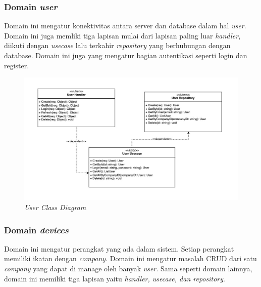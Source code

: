 \pagebreak

\subsubsection{Domain \textit{user}}

Domain ini mengatur konektivitas antara server dan database dalam hal \textit{user}. Domain ini juga memliki tiga lapisan mulai dari lapisan paling luar \textit{handler}, diikuti dengan \textit{usecase} lalu terkahir \textit{repository} yang berhubungan dengan database. Domain ini juga yang mengatur bagian autentikasi seperti login dan register.

\begin{figure}[ht]
  \centering
  \includegraphics[width=1\textwidth]{resources/chapter-3/class/user-class-diagram.jpg}
  \caption{\t\textit{User Class Diagram}}
  \label{fig:user-class-diagram}
\end{figure}

\subsubsection{Domain \textit{devices}}

Domain ini mengatur perangkat yang ada dalam sistem. Setiap perangkat memiliki ikatan dengan \textit{company}. Domain ini mengatur masalah CRUD dari satu \textit{company} yang dapat di manage oleh banyak \textit{user}. Sama seperti domain lainnya, domain ini memiliki tiga lapisan yaitu \textit{handler, usecase, dan repository}.


